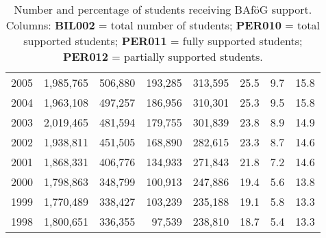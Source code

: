 \begin{landscape}
\begin{table}
\begin{tabular}{rrrrrrrr}
2005 & 1,985,765 & 506,880 & 193,285 & 313,595 & 25.5 & 9.7 & 15.8 \\
2004 & 1,963,108 & 497,257 & 186,956 & 310,301 & 25.3 & 9.5 & 15.8 \\
2003 & 2,019,465 & 481,594 & 179,755 & 301,839 & 23.8 & 8.9 & 14.9 \\
2002 & 1,938,811 & 451,505 & 168,890 & 282,615 & 23.3 & 8.7 & 14.6 \\
2001 & 1,868,331 & 406,776 & 134,933 & 271,843 & 21.8 & 7.2 & 14.6 \\
2000 & 1,798,863 & 348,799 & 100,913 & 247,886 & 19.4 & 5.6 & 13.8 \\
1999 & 1,770,489 & 338,427 & 103,239 & 235,188 & 19.1 & 5.8 & 13.3 \\
1998 & 1,800,651 & 336,355 & 97,539 & 238,810 & 18.7 & 5.4 & 13.3 \\
\bottomrule
\end{tabular}
\caption{
  Number and percentage of students receiving BAföG support.  
  Columns:  
  \textbf{BIL002} = total number of students;  
  \textbf{PER010} = total supported students;  
  \textbf{PER011} = fully supported students;  
  \textbf{PER012} = partially supported students.
}
\label{table:bafoeg_support_landscape}
\end{table}
\end{landscape}





